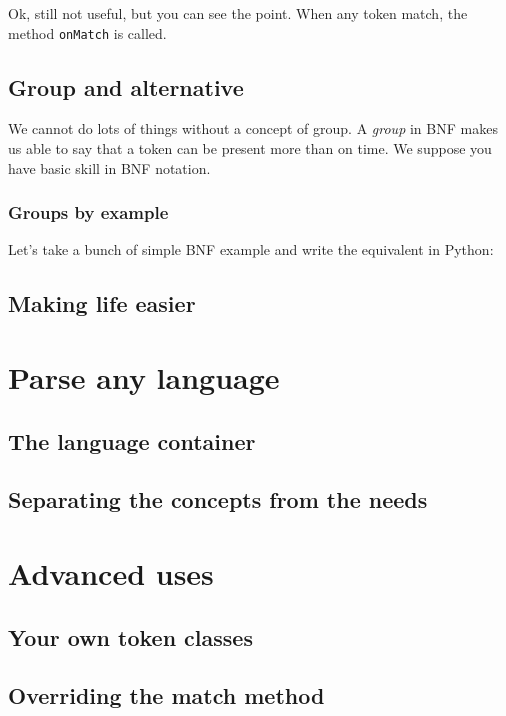 \documentclass[a4paper]{article}
\newcommand{\insertpython}[1]{%
{\ttfamily}%
}
\begin{document}
                Ok, still not useful, but you can see the point. When any token match,
                the method \texttt{onMatch} is called.

        \subsection{Group and alternative}
            We cannot do lots of things without a concept of group. A \textit{group} in BNF
            makes us able to say that a token can be present more than on time. We suppose
            you have basic skill in BNF notation.

            \subsubsection{Groups by example}
                Let's take a bunch of simple BNF example and write the equivalent in Python:
                \insertpython{listings/bnf/ex04.py}



        \subsection{Making life easier}

    \newpage
    \section{Parse any language}
        \subsection{The language container}
        \subsection{Separating the concepts from the needs}
        \subsection{}

    \newpage
    \section{Advanced uses}
        \subsection{Your own token classes}
        \subsection{Overriding the match method}
        \subsection{}
\end{document}
